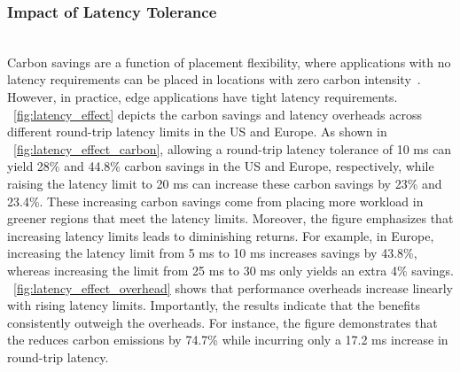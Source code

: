 \subsubsection{Impact of Latency Tolerance}\label{sec:eval_latency}\hfill\\
Carbon savings are a function of placement flexibility, where applications with no latency requirements can be placed in locations with zero carbon intensity~\cite{sukprasert2024limitations}. However, in practice, edge applications have tight latency requirements. ~\autoref{fig:latency_effect} depicts the carbon savings and latency overheads across different round-trip latency limits in the US and Europe. As shown in ~\autoref{fig:latency_effect_carbon}, allowing a round-trip latency tolerance of 10 ms can yield 28\% and 44.8\% carbon savings in the US and Europe, respectively, while raising the latency limit to 20 ms can increase these carbon savings by 23\% and 23.4\%. These increasing carbon savings come from placing more workload in greener regions that meet the latency limits. 
Moreover, the figure emphasizes that increasing latency limits leads to diminishing returns. For example, in Europe, increasing the latency limit from 5 ms to 10 ms increases savings by 43.8\%, whereas increasing the limit from 25 ms to 30 ms only yields an extra 4\% savings. ~\autoref{fig:latency_effect_overhead} shows that performance overheads increase linearly with rising latency limits. Importantly, the results indicate that the benefits consistently outweigh the overheads. For instance, the figure demonstrates that the \proposedsystem reduces carbon emissions by 74.7\% while incurring only a 17.2 ms increase in round-trip latency. 







